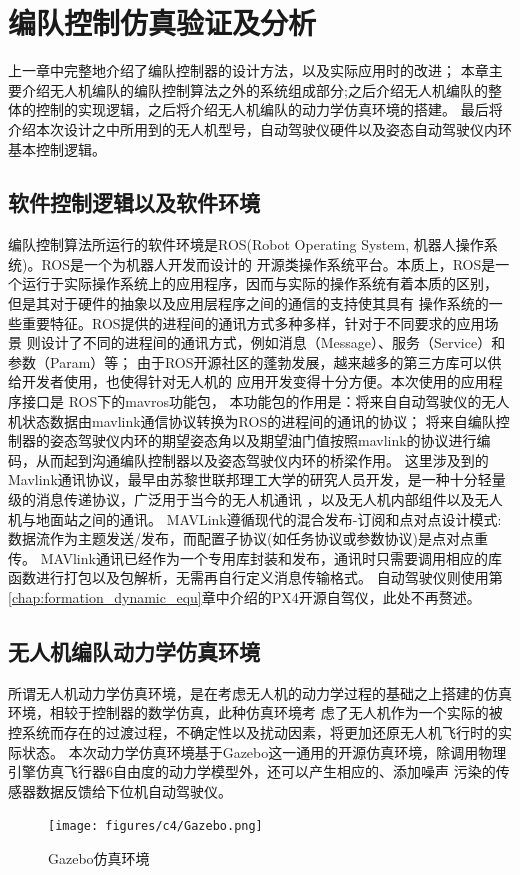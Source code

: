 \chapter{编队控制仿真验证及分析}
\label{chap:hardware}
上一章中完整地介绍了编队控制器的设计方法，以及实际应用时的改进；
本章主要介绍无人机编队的编队控制算法之外的系统组成部分;之后介绍无人机编队的整体的控制的实现逻辑，之后将介绍无人机编队的动力学仿真环境的搭建。
最后将介绍本次设计之中所用到的无人机型号，自动驾驶仪硬件以及姿态自动驾驶仪内环基本控制逻辑。
\section{ 软件控制逻辑以及软件环境 }
编队控制算法所运行的软件环境是ROS(Robot Operating System, 机器人操作系统)。ROS是一个为机器人开发而设计的
开源类操作系统平台。本质上，ROS是一个运行于实际操作系统上的应用程序，因而与实际的操作系统有着本质的区别，
但是其对于硬件的抽象以及应用层程序之间的通信的支持使其具有
操作系统的一些重要特征。ROS提供的进程间的通讯方式多种多样，针对于不同要求的应用场景
则设计了不同的进程间的通讯方式，例如消息（Message）、服务（Service）和参数（Param）等；
由于ROS开源社区的蓬勃发展，越来越多的第三方库可以供给开发者使用，也使得针对无人机的
应用开发变得十分方便。本次使用的应用程序接口是
ROS下的mavros功能包，
本功能包的作用是：将来自自动驾驶仪的无人机状态数据由mavlink通信协议转换为ROS的进程间的通讯的协议；
将来自编队控制器的姿态驾驶仪内环的期望姿态角以及期望油门值按照mavlink的协议进行编码，从而起到沟通编队控制器以及姿态驾驶仪内环的桥梁作用。
这里涉及到的Mavlink通讯协议，最早由苏黎世联邦理工大学的研究人员开发，是一种十分轻量级的消息传递协议，广泛用于当今的无人机通讯
，以及无人机内部组件以及无人机与地面站之间的通讯。
MAVLink遵循现代的混合发布-订阅和点对点设计模式:数据流作为主题发送/发布，而配置子协议(如任务协议或参数协议)是点对点重传。
MAVlink通讯已经作为一个专用库封装和发布，通讯时只需要调用相应的库函数进行打包以及包解析，无需再自行定义消息传输格式。
自动驾驶仪则使用第\ref{chap:formation_dynamic_equ}章中介绍的PX4开源自驾仪，此处不再赘述。
\section{无人机编队动力学仿真环境}
所谓无人机动力学仿真环境，是在考虑无人机的动力学过程的基础之上搭建的仿真环境，相较于控制器的数学仿真，此种仿真环境考
虑了无人机作为一个实际的被控系统而存在的过渡过程，不确定性以及扰动因素，将更加还原无人机飞行时的实际状态。
本次动力学仿真环境基于Gazebo这一通用的开源仿真环境，除调用物理引擎仿真飞行器6自由度的动力学模型外，还可以产生相应的、添加噪声
污染的传感器数据反馈给下位机自动驾驶仪。
\begin{figure}[H]
    \centering
    \texttt{[image: figures/c4/Gazebo.png]}
    \caption{Gazebo仿真环境}\label{fig:c4-Gazebo}
\end{figure}


